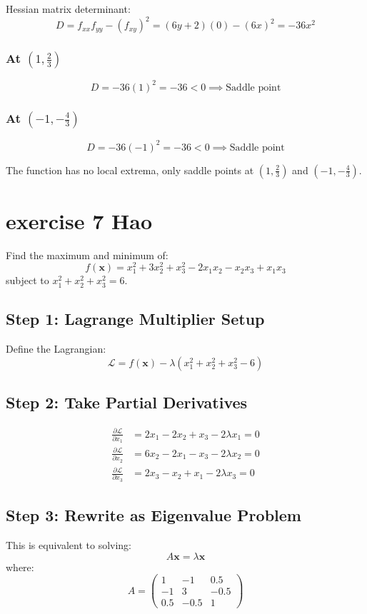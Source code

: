 \documentclass{article}
\begin{document}
Hessian matrix determinant:
\[ D = f_{xx}f_{yy} - (f_{xy})^{2} = (6y + 2)(0) - (6x)^{2} = -36x^{2} \]

\subsubsection*{At $(1, \frac{2}{3})$}
\[ D = -36(1)^{2} = -36 < 0 \implies \text{Saddle point} \]

\subsubsection*{At $(-1, -\frac{4}{3})$}
\[ D = -36(-1)^{2} = -36 < 0 \implies \text{Saddle point} \]

The function has no local extrema, only saddle points at $(1, \frac{2}{3})$ and $(-1, -\frac{4}{3})$.


\section{exercise 7 Hao}
Find the maximum and minimum of:
\[ f(\mathbf{x}) = x_{1}^{2} + 3x_{2}^{2} + x_{3}^{2} - 2x_{1}x_{2} - x_{2}x_{3} + x_{1}x_{3} \]
subject to $x_{1}^{2} + x_{2}^{2} + x_{3}^{2} = 6$.

\subsection*{Step 1: Lagrange Multiplier Setup}
Define the Lagrangian:
\[ \mathcal{L} = f(\mathbf{x}) - \lambda(x_{1}^{2} + x_{2}^{2} + x_{3}^{2} - 6) \]

\subsection*{Step 2: Take Partial Derivatives}
\begin{align*}
\frac{\partial \mathcal{L}}{\partial x_{1}} &= 2x_{1} - 2x_{2} + x_{3} - 2\lambda x_{1} = 0 \\
\frac{\partial \mathcal{L}}{\partial x_{2}} &= 6x_{2} - 2x_{1} - x_{3} - 2\lambda x_{2} = 0 \\
\frac{\partial \mathcal{L}}{\partial x_{3}} &= 2x_{3} - x_{2} + x_{1} - 2\lambda x_{3} = 0
\end{align*}

\subsection*{Step 3: Rewrite as Eigenvalue Problem}
This is equivalent to solving:
\[ A\mathbf{x} = \lambda\mathbf{x} \]
where:
\[ A = \begin{pmatrix}
1 & -1 & 0.5 \\
-1 & 3 & -0.5 \\
0.5 & -0.5 & 1
\end{pmatrix} \]
\end{document}
